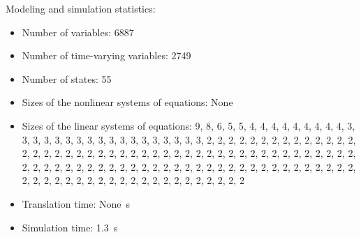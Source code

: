 \begin{contextbox}
  Modeling and simulation statistics:
  \begin{itemize}
    \item Number of variables: 6887
    \item Number of time-varying variables: 2749
    \item Number of states: 55
    \item Sizes of the nonlinear systems of equations: None
    \item Sizes of the linear systems of equations: 9, 8, 6, 5, 5, 4, 4, 4, 4, 4, 4, 4, 4, 4, 3, 3, 3, 3, 3, 3, 3, 3, 3, 3, 3, 3, 3, 3, 3, 3, 3, 3, 2, 2, 2, 2, 2, 2, 2, 2, 2, 2, 2, 2, 2, 2, 2, 2, 2, 2, 2, 2, 2, 2, 2, 2, 2, 2, 2, 2, 2, 2, 2, 2, 2, 2, 2, 2, 2, 2, 2, 2, 2, 2, 2, 2, 2, 2, 2, 2, 2, 2, 2, 2, 2, 2, 2, 2, 2, 2, 2, 2, 2, 2, 2, 2, 2, 2, 2, 2, 2, 2, 2, 2, 2, 2, 2, 2, 2, 2, 2, 2, 2, 2, 2, 2, 2, 2, 2, 2, 2, 2, 2, 2, 2, 2, 2, 2, 2
    \item Translation time: \SI{None}{s}
    \item Simulation time: \SI{1.3}{s}
  \end{itemize}
\end{contextbox}
